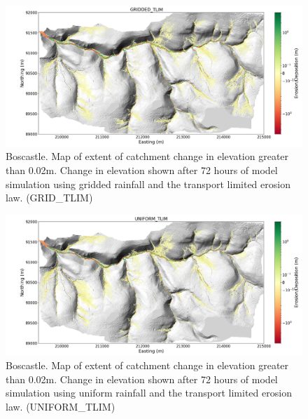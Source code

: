 \begin{figure}
\includegraphics[width=25cm]{chp06_figures_scripts/boscastle_erodediff_grid_tlim.png}
\caption{Boscastle. Map of extent of catchment change in elevation greater than 0.02m. Change in elevation shown after 72 hours of model simulation using gridded rainfall and the transport limited erosion law. (GRID\_TLIM)}
\label{fig_boscastle_erodediff_grid_tlim}
\end{figure}

\begin{figure}
\includegraphics[width=25cm]{chp06_figures_scripts/boscastle_erodediff_uniform_tlim.png}
\caption{Boscastle. Map of extent of catchment change in elevation greater than 0.02m. Change in elevation shown after 72 hours of model simulation using uniform rainfall and the transport limited erosion law. (UNIFORM\_TLIM)}
\label{fig_boscastle_erodediff_uniform_tlim}
\end{figure}

